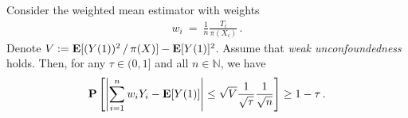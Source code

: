 \begin{theorem*}
  Consider the weighted mean estimator with weights
  \begin{gather}
    w_i
    \ 
    =
    \ 
    \frac{1}{n}
    \frac{T_i}{\pi(X_i)}
    \,.
  \end{gather}
  Denote
  $
    V:=
    \mathbf{E}[
    (
      Y(1)
    )^2
    \,/\,
    \pi(X)
    ]
    -
    \mathbf{E}[Y(1)]^2
  $.  
  Assume that \textit{weak unconfoundedness} holds.
  Then, for any $\tau \in (0,1]$ and all $n\in\mathbb{N}$, we have
  \begin{gather}
   \mathbf{P}
   \left[
     \left| 
   \sum_{i=1}^{n}
   w_iY_i - \mathbf{E}[Y(1)]
     \right|
     \le
     \sqrt{V}
     \frac{1}{\sqrt{\tau}}
     \frac{1}{\sqrt{n}}
   \right]
   \ge
   1-\tau\,.
  \end{gather}

\end{theorem*}
